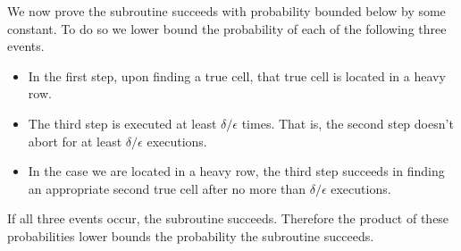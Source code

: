 We now prove the subroutine succeeds with probability bounded below by some constant.
To do so we lower bound the probability of each of the following three events.
\begin{itemize}
    \item
    In the first step, upon finding a true cell, that true cell is located in a heavy row.
    \item
    The third step is executed at least $\delta/\epsilon$ times. That is, the second step doesn't abort for at least $\delta/\epsilon$ executions.
    \item
    In the case we are located in a heavy row, the third step succeeds in finding an appropriate second true cell after no more than $\delta/\epsilon$ executions.
\end{itemize}
If all three events occur, the subroutine succeeds.
Therefore the product of these probabilities lower bounds the probability the subroutine succeeds.

